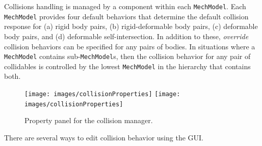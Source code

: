 \documentclass{article}
\begin{document}
Collisions handling is managed by
a  component
within each {\tt MechModel}.  Each {\tt MechModel} provides four
default behaviors that determine the default collision response for
(a) rigid body pairs, (b) rigid-deformable body pairs, (c) deformable
body pairs, and (d) deformable self-intersection. In addition to
these, {\it override} collision behaviors can be specified for any
pairs of bodies.  In situations where a {\tt MechModel} contains
sub-{\tt MechModel}s, then the collision behavior for any pair of
collidables is controlled by the lowest {\tt MechModel} in the
hierarchy that contains both.

\begin{figure}[h]
\begin{center}
\iflatexml
\texttt{[image: images/collisionProperties]}
\else
\texttt{[image: images/collisionProperties]}
\fi
\end{center}
\caption{Property panel for the collision manager.}
\label{collisionProperties:fig}
\end{figure}

There are several ways to edit collision behavior using the GUI.
\end{document}
